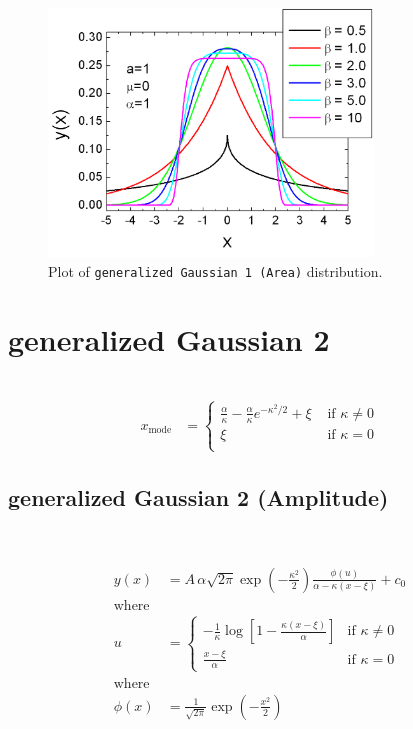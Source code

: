 \begin{figure}[htb]
\begin{center}
\includegraphics[width=0.768\textwidth]{generalizedGaussian1Area.png}
\end{center}
\caption{Plot of \texttt{generalized Gaussian 1 (Area)}
distribution.} \label{fig:generalizedGaussian1Area}
\end{figure}

\clearpage
\section{generalized Gaussian 2} ~\\
\label{sec:generalizedGaussian2}
\begin{align}
x_\text{mode} & =
\begin{cases} \frac{\alpha}{\kappa} - \frac{\alpha}{\kappa}
e^{-\kappa^2/2} + \xi & \text{ if } \kappa \neq 0 \\
\xi & \text{ if } \kappa = 0 \\
\end{cases}
\end{align}

\clearpage
\subsection{generalized Gaussian 2 (Amplitude)} ~\\
\label{sec:generalizedGaussian2Amplitude}

\begin{align}
y(x) &= A\, \alpha\sqrt{2\pi}\exp\left(-\frac{\kappa^2}{2}\right)
\frac{\phi(u)}{\alpha-\kappa(x-\xi)} + c_0\\
\text{where} & \nonumber \\
u &=
\begin{cases}
- \frac{1}{\kappa} \log \left[ 1-
\frac{\kappa(x-\xi)}{\alpha} \right] & \text{if } \kappa \neq 0 \\
\frac{x-\xi}{\alpha} & \text{if } \kappa=0
\end{cases} \\
\text{where} & \nonumber \\
\phi(x) &= \frac{1}{\sqrt{2\pi}} \exp\left(-\frac{x^2}{2}\right)
\end{align}

